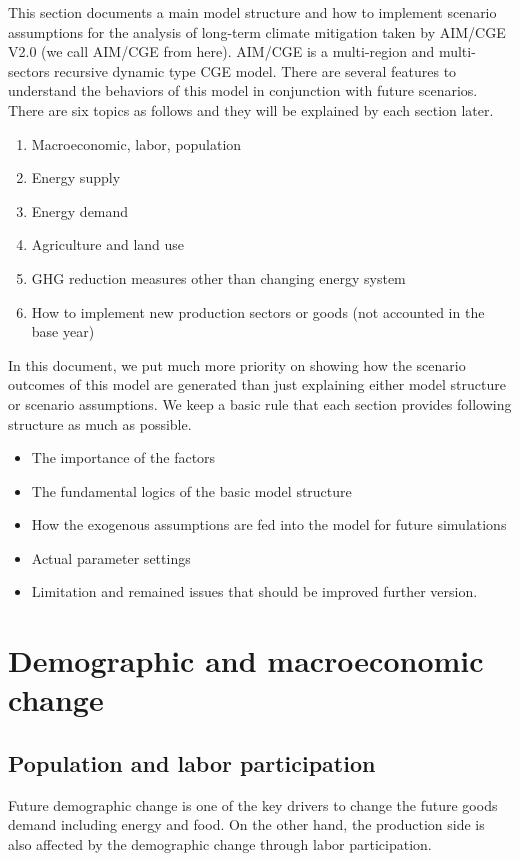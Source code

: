 \documentclass[10pt,a4paper,titlepage,dvipdfmx]{book}
\begin{document}
This section documents a main model structure and how to implement scenario assumptions for the analysis of long-term climate mitigation taken by AIM/CGE V2.0 (we call AIM/CGE from here). AIM/CGE is a multi-region and multi-sectors recursive dynamic type CGE model. There are several features to understand the behaviors of this model in conjunction with future scenarios. There are six topics as follows and they will be explained by each section later.
\begin{enumerate}[{1)}]
\item {Macroeconomic, labor, population}
\item {Energy supply}
\item {Energy demand} 
\item {Agriculture and land use}
\item {GHG reduction measures other than changing energy system}
\item {How to implement new production sectors or goods (not accounted in the base year)}
\end{enumerate}
{In this document, we put much more priority on showing how the scenario outcomes of this model are generated than just explaining either model structure or scenario assumptions. We keep a basic rule that each section provides following structure as much as possible.}
\begin{itemize}
\item  {The importance of the factors}
\item  {The fundamental logics of the basic model structure} 
\item  {How the exogenous assumptions are fed into the model for future simulations}
\item  {Actual parameter settings}
\item  {Limitation and remained issues that should be improved further version.}
\end{itemize}
\section{\label{sec:DemMacCha}Demographic and macroeconomic change }

\subsection{\label{subsec:PopLabPar}Population and labor participation}

Future demographic change is one of the key drivers to change the future goods demand including energy and food. On the other hand, the production side is also affected by the demographic change through labor participation.
\end{document}
